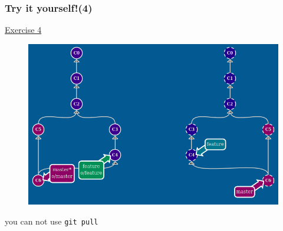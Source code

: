 \documentclass{beamer}
\begin{document}
\begin{frame}
    \frametitle{Try it yourself!(4)}
    \begin{center}
        \href{https://learngitbranching.js.org/?NODEMO\&command=git\%20commit;git\%20checkout\%20-b\%20feature;git\%20clone;git\%20fakeTeamwork\%20feature;git\%20fakeTeamwork\%20feature;git\%20checkout\%20master;git\%20commit}{Exercise 4}
    \end{center}
    \begin{figure}
        \includegraphics[scale=0.3]{imgs/ex4.png}
    \end{figure}
    \begin{center}
        you can not use \texttt{git pull}
    \end{center}
\end{frame}
\end{document}
